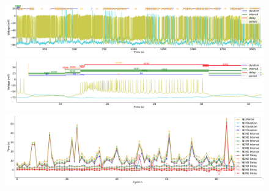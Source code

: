 %






\begin{figure}[htbp]
	\centering
	\begin{minipage}[b]{\textwidth}
		\centering
		\includegraphics[width=\textwidth,height=0.1\textheight]{./invariants/data/SUSSEX/prep2/images/spontaneous_signal_intervals_zoom.pdf}
		\includegraphics[width=\textwidth]{./invariants/data/SUSSEX/prep2/images/spontaneous_signal_intervals_cycle.pdf}
		\includegraphics[width=\textwidth]{./invariants/data/SUSSEX/prep2/images/spontaneous_time_cycle.pdf}
	\end{minipage}
	\begin{minipage}{0.9\textwidth}
		\centering
		\begin{minipage}[b]{0.45\textwidth}
			\centering

\end{minipage}
\end{minipage}
\end{figure}
